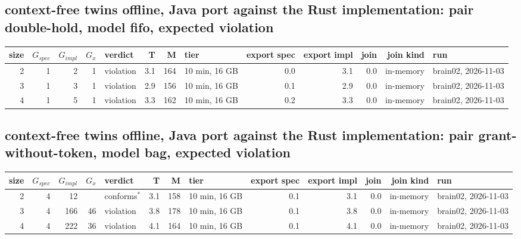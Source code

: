 \documentclass[10pt]{article}
\begin{document}
\subsection*{context-free twins offline, Java port against the Rust implementation: pair \textsf{double-hold}, model fifo, expected violation}
\begin{longtable}{@{}rrrrlrrlrrrrl@{}}
\toprule
size & $G_{\mathit{spec}}$ & $G_{\mathit{impl}}$ & $G_x$ & verdict & T & M & tier & export spec & export impl & join & join kind & run \\
\midrule
\endhead
\color{red} 2 & 1 & 2 & 1 & violation & 3.1 & 164 & 10 min, 16 GB & 0.0 & 3.1 & 0.0 & in-memory & brain02, 2026-11-03 \\
\color{red} 3 & 1 & 3 & 1 & violation & 2.9 & 156 & 10 min, 16 GB & 0.1 & 2.9 & 0.0 & in-memory & brain02, 2026-11-03 \\
\color{red} 4 & 1 & 5 & 1 & violation & 3.3 & 162 & 10 min, 16 GB & 0.2 & 3.3 & 0.0 & in-memory & brain02, 2026-11-03 \\
\bottomrule
\end{longtable}
\subsection*{context-free twins offline, Java port against the Rust implementation: pair \textsf{grant-without-token}, model bag, expected violation}
\begin{longtable}{@{}rrrrlrrlrrrrl@{}}
\toprule
size & $G_{\mathit{spec}}$ & $G_{\mathit{impl}}$ & $G_x$ & verdict & T & M & tier & export spec & export impl & join & join kind & run \\
\midrule
\endhead
\color{red} 2 & 4 & 12 &  & conforms$^{\ast}$ & 3.1 & 158 & 10 min, 16 GB & 0.1 & 3.1 & 0.0 & in-memory & brain02, 2026-11-03 \\
\color{red} 3 & 4 & 166 & 46 & violation & 3.8 & 178 & 10 min, 16 GB & 0.1 & 3.8 & 0.0 & in-memory & brain02, 2026-11-03 \\
\color{red} 4 & 4 & 222 & 36 & violation & 4.1 & 164 & 10 min, 16 GB & 0.1 & 4.1 & 0.0 & in-memory & brain02, 2026-11-03 \\
\bottomrule
\end{longtable}
\end{document}
